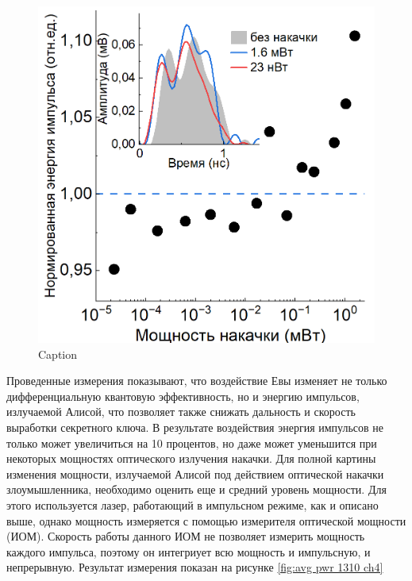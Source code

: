 \begin{figure}
    \centering
    \includegraphics[width=\linewidth]{images/1310_энергия.png}
    \caption{Caption}
    \label{fig:energy 1310 ch4}
\end{figure}
Проведенные измерения показывают, что воздействие Евы изменяет не только дифференциальную квантовую эффективность, но и энергию импульсов, излучаемой Алисой, что позволяет также снижать дальность и скорость выработки секретного ключа. В результате воздействия энергия импульсов не только может увеличиться на 10 процентов, но даже может уменьшится при некоторых мощностях оптического излучения накачки.
\newline Для полной картины изменения мощности, излучаемой Алисой под действием оптической накачки злоумышленника, необходимо оценить еще  и средний уровень мощности. Для этого используется лазер, работающий в импульсном режиме, как и описано выше, однако мощность измеряется с помощью измерителя оптической мощности (ИОМ). Скорость работы данного ИОМ не позволяет измерить мощность каждого импульса, поэтому он интегриует всю мощность и импульсную, и непрерывную. Результат измерения показан на рисунке \ref{fig:avg pwr 1310 ch4} 
